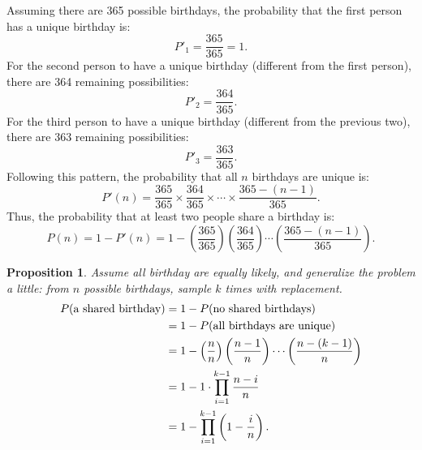 \documentclass[12pt,openany]{book}
\newtheorem{proposition}[theorem]{Proposition}
\theoremstyle{definition}
\newcommand{\of}[1]{\left( #1 \right)}
\begin{document}
	\newpage
	Assuming there are 365 possible birthdays, the probability that the first person has a unique birthday is:
	\begin{equation*}
		P'_1 = \frac{365}{365} = 1.
	\end{equation*}
	For the second person to have a unique birthday (different from the first person), there are 364 remaining possibilities:
	\begin{equation*}
		P'_2 = \frac{364}{365}.
	\end{equation*}
	For the third person to have a unique birthday (different from the previous two), there are 363 remaining possibilities:
	\begin{equation*}
		P'_3 = \frac{363}{365}.
	\end{equation*}
	Following this pattern, the probability that all $n$ birthdays are unique is:
	\begin{equation*}
		P'(n) = \frac{365}{365} \times \frac{364}{365} \times \cdots \times \frac{365 - (n - 1)}{365}.
	\end{equation*}
	Thus, the probability that at least two people share a birthday is:
	\begin{equation*}
		P(n) = 1 - P'(n)=1-\of{\frac{365}{365}}\of{\frac{364}{365}}\cdots\of{\frac{365-(n-1)}{365}}.
	\end{equation*}
	\vspace{8pt}
	\begin{tcolorbox}[colback=white,colframe=procolor,arc=5pt,title={\color{white}\bf Generalization of Birthday Problem}]
		\begin{proposition}
			Assume all birthday are equally likely, and generalize the problem a little: \textnormal{from $n$ possible birthdays, sample $k$ times with replacement}. \begin{align*}
				P(\textnormal{a shared birthday})&=1-P(\textnormal{no shared birthdays})\\
				&=1-P(\textnormal{all birthdays are unique})\\
				&=1-\of{\frac{n}{n}}\of{\frac{n-1}{n}}\cdots\of{\frac{n-(k-1)}{n}}\\
				&=1-1\cdot \prod_{i=1}^{k-1}\frac{n-i}{n}\\
				&=1-\prod_{i=1}^{k-1}\of{1-\frac{i}{n}}.
			\end{align*}
		\end{proposition}
	\end{tcolorbox}
	
\end{document}
